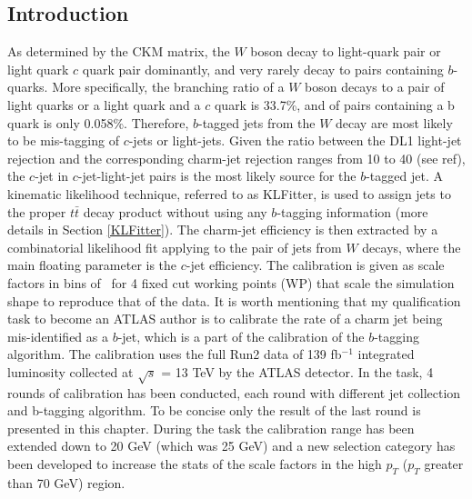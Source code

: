 \documentclass[letterpaper,12pt]{article}
\begin{document}
\subsection{Introduction}
\label{sec:Introduction}
As determined by the CKM matrix\cite{CKM1}\cite{CKM2}, the $W$ boson decay to light-quark pair or 
light quark $c$ quark pair dominantly, and very rarely decay to pairs containing $b$-quarks. 
More specifically, the branching ratio of a $W$ boson decays to a pair of light quarks or a light quark 
and a $c$ quark is 33.7\%, and of pairs containing a b quark is only 0.058\%\cite{PDG}. 
Therefore, $b$-tagged jets from the $W$ decay are most likely to be mis-tagging of $c$-jets or 
light-jets. Given the ratio between the DL1 light-jet rejection and the corresponding charm-jet rejection 
ranges from 10 to 40 (see ref\cite{ATL-PHYS-PUB-2017-013}), the 
$c$-jet in $c$-jet-light-jet pairs is the most likely source for the 
$b$-tagged jet. A kinematic likelihood technique, referred to as 
KLFitter\cite{ERDMANN201418}, is used to assign jets to the proper $t\bar{t}$ decay product 
without using any $b$-tagging information (more details in Section \ref{KLFitter}). 
The charm-jet efficiency is then extracted by a combinatorial likelihood fit applying to the pair 
of jets from $W$ decays, where the main floating parameter is the $c$-jet efficiency\cite{cjet}. 
The calibration is given as scale factors in bins of \pt\ for 4 fixed cut working points (WP) 
that scale the simulation shape to reproduce that of the data.
It is worth mentioning that my qualification task to become an ATLAS author is to 
calibrate the rate of a charm jet being mis-identified as a $b$-jet, which is a part 
of the calibration of the $b$-tagging algorithm. The calibration uses the full Run2 data 
of 139 fb$^{-1}$ integrated luminosity collected at $\sqrt{s}$ = 13 TeV by the ATLAS detector. 
In the task, 4 rounds of calibration has been conducted, each round with different jet collection 
and b-tagging algorithm. To be concise only the result of the last round is presented in this chapter. 
During the task the calibration range has been extended down to 20 GeV (which was 25 GeV) and a new 
selection category has been developed to increase the stats of the scale factors in the 
high $p_T$ ($p_T$ greater than 70 GeV) region.
\end{document}
